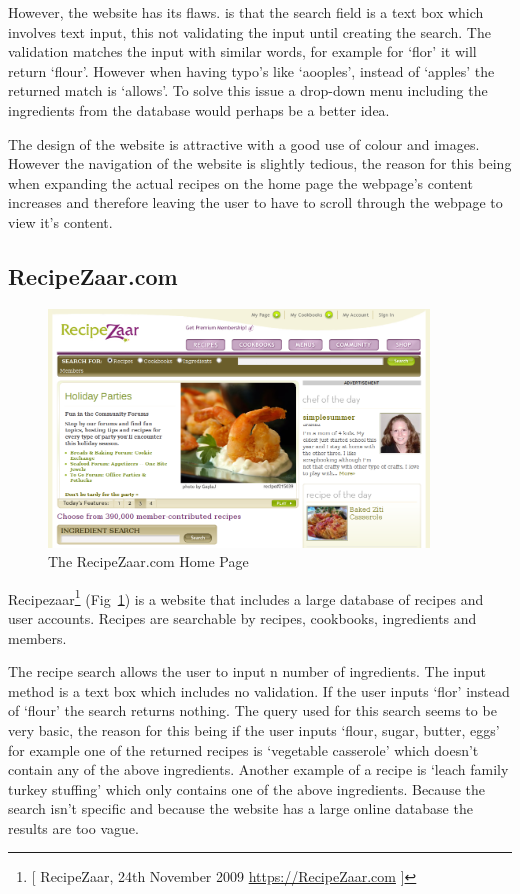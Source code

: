 However, the website has its flaws. is that the search field is a text box which involves text input, this not validating the input until creating the search. The validation matches the input with similar words, for example for ‘flor’ it will return ‘flour’. However when having typo’s like ‘aooples’, instead of ‘apples’ the returned match is ‘allows’. To solve this issue a drop-down menu including the ingredients from the database would perhaps be a better idea.

The design of the website is attractive with a good use of colour and images. However the navigation of the website is slightly tedious, the reason for this being when expanding the actual recipes on the home page the webpage’s content increases and therefore leaving the user to have to scroll through the webpage to view it’s content.

\subsection{RecipeZaar.com}

\begin{figure}[h]
\includegraphics[width=0.9\textwidth]{screenshot_recipezaar}
\caption{The RecipeZaar.com Home Page}
\label{fig:recipezaar}
\end{figure}

Recipezaar\footnote{[ RecipeZaar, 24th November 2009 \url{https://RecipeZaar.com} ]} (Fig~\ref{fig:recipezaar}) is a website that includes a large database of recipes and user accounts. Recipes are searchable by recipes, cookbooks, ingredients and members. 

The recipe search allows the user to input n number of ingredients. The input method is a text box which includes no validation. If the user inputs ‘flor’ instead of ‘flour’ the search returns nothing. The query used for this search seems to be very basic, the reason for this being if the user inputs ‘flour, sugar, butter, eggs’ for example one of the returned recipes is ‘vegetable casserole’ which doesn’t contain any of the above ingredients. Another example of a recipe is ‘leach family turkey stuffing’ which only contains one of the above ingredients. Because the search isn’t specific and because the website has a large online database the results are too vague.

